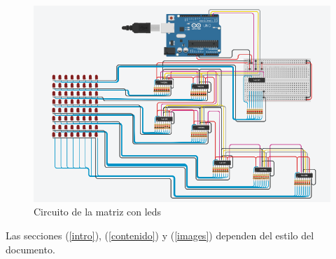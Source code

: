 \documentclass{article}
\begin{document}
\begin{figure}[h]
\includegraphics[scale=0.7]{circuito.PNG}
\graphicspath{ {images/} }
\centering
\caption{Circuito de la matriz con leds}
\label{fig:circuito.PNG}
\end{figure}

Las secciones (\ref{intro}), (\ref{contenido}) y (\ref{images}) dependen del estilo del documento.


\end{document}
